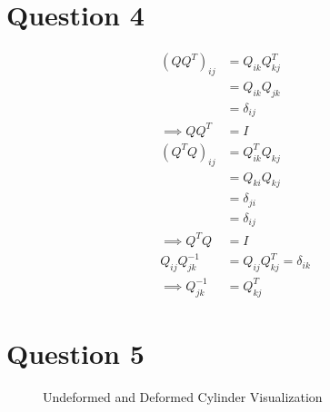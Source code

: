 \documentclass[a4paper,12pt]{article} %
\begin{document}
\newpage
\section{\textbf{Question 4}}
\begin{align*}
    (QQ^T)_{ij} &= Q_{ik} Q^T_{kj} \\
&= Q_{ik} Q_{jk} \\
&= \delta_{ij} \\
\implies QQ^T &= I\\
(Q^TQ)_{ij} &= Q^T_{ik} Q_{kj} \\
&= Q_{ki} Q_{kj} \\
&= \delta_{ji} \\
&= \delta_{ij} \\
\implies Q^TQ &= I \\
Q_{ij} Q^{-1}_{jk} &= Q_{ij} Q^T_{kj} = \delta_{ik} \\
    \implies Q^{-1}_{jk} &= Q^T_{kj}
\end{align*}

\newpage
\section{\textbf{Question 5}}


\begin{figure}[htbp]
    
    \caption{Undeformed and Deformed Cylinder Visualization}
\label{figure}
\end{figure}
\end{document}
